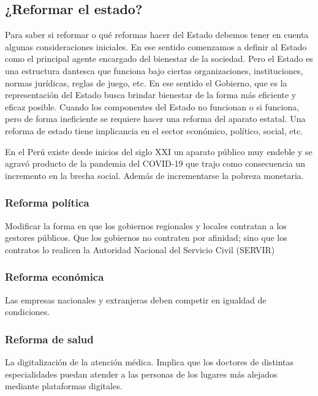 \documentclass[
  jou,
  floatsintext,
  longtable,
  a4paper,
  nolmodern,
  notxfonts,
  notimes,
  colorlinks=true,linkcolor=blue,citecolor=blue,urlcolor=blue]{apa7}
\begin{document}
\subsection{¿Reformar el estado?}\label{reformar-el-estado}

Para saber si reformar o qué reformas hacer del Estado debemos tener en
cuenta algunas consideraciones iniciales. En ese sentido comenzamos a
definir al Estado como el principal agente encargado del bienestar de la
sociedad. Pero el Estado es una estructura dantesca que funciona bajo
ciertas organizaciones, instituciones, normas jurídicas, reglas de
juego, etc. En ese sentido el Gobierno, que es la representación del
Estado busca brindar bienestar de la forma más eficiente y eficaz
posible. Cuando los componentes del Estado no funcionan o si funciona,
pero de forma ineficiente se requiere hacer una reforma del aparato
estatal. Una reforma de estado tiene implicancia en el sector económico,
político, social, etc.

En el Perú existe desde inicios del siglo XXI un aparato público muy
endeble y se agravó producto de la pandemia del COVID-19 que trajo como
consecuencia un incremento en la brecha social. Además de incrementarse
la pobreza monetaria.

\subsubsection{Reforma política}\label{reforma-poluxedtica}

Modificar la forma en que los gobiernos regionales y locales contratan a
los gestores públicos. Que los gobiernos no contraten por afinidad; sino
que los contratos lo realicen la Autoridad Nacional del Servicio Civil
(SERVIR)

\subsubsection{Reforma económica}\label{reforma-econuxf3mica}

Las empresas nacionales y extranjeras deben competir en igualdad de
condiciones.

\subsubsection{Reforma de salud}\label{reforma-de-salud}

La digitalización de la atención médica. Implica que los doctores de
distintas especialidades puedan atender a las personas de los lugares
más alejados mediante plataformas digitales.
\end{document}
